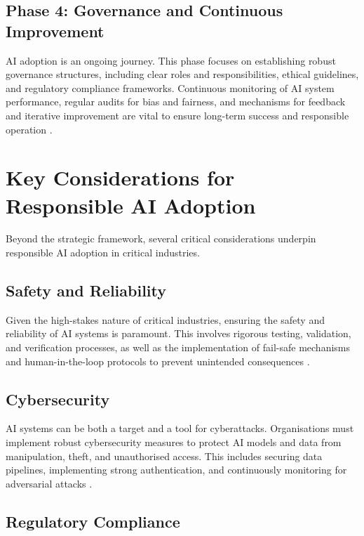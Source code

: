 \subsection{Phase 4: Governance and Continuous Improvement}

AI adoption is an ongoing journey. This phase focuses on establishing robust governance structures, including clear roles and responsibilities, ethical guidelines, and regulatory compliance frameworks. Continuous monitoring of AI system performance, regular audits for bias and fairness, and mechanisms for feedback and iterative improvement are vital to ensure long-term success and responsible operation \parencite{leyliabadi2025conceptual}.

\section{Key Considerations for Responsible AI Adoption}

Beyond the strategic framework, several critical considerations underpin responsible AI adoption in critical industries.

\subsection{Safety and Reliability}

Given the high-stakes nature of critical industries, ensuring the safety and reliability of AI systems is paramount. This involves rigorous testing, validation, and verification processes, as well as the implementation of fail-safe mechanisms and human-in-the-loop protocols to prevent unintended consequences \parencite{dhs2024roles}.

\subsection{Cybersecurity}

AI systems can be both a target and a tool for cyberattacks. Organisations must implement robust cybersecurity measures to protect AI models and data from manipulation, theft, and unauthorised access. This includes securing data pipelines, implementing strong authentication, and continuously monitoring for adversarial attacks \parencite{cisc2025artificial}.

\subsection{Regulatory Compliance}

